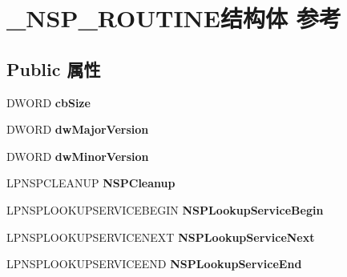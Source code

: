 \hypertarget{struct___n_s_p___r_o_u_t_i_n_e}{}\section{\+\_\+\+N\+S\+P\+\_\+\+R\+O\+U\+T\+I\+N\+E结构体 参考}
\label{struct___n_s_p___r_o_u_t_i_n_e}
\subsection*{Public 属性}
\begin{DoxyCompactItemize}
\item 
\mbox{\label{struct___n_s_p___r_o_u_t_i_n_e_ae17aa42cd98a70ca1a52e890ddb183b8}} 
D\+W\+O\+RD {\bfseries cb\+Size}
\item 
\mbox{\label{struct___n_s_p___r_o_u_t_i_n_e_a7c87db5336b73e35000628209497938e}} 
D\+W\+O\+RD {\bfseries dw\+Major\+Version}
\item 
\mbox{\label{struct___n_s_p___r_o_u_t_i_n_e_a803703593b52133727b5531937d79b9e}} 
D\+W\+O\+RD {\bfseries dw\+Minor\+Version}
\item 
\mbox{\label{struct___n_s_p___r_o_u_t_i_n_e_a62db9f10f983d97d85a63c59b890886e}} 
L\+P\+N\+S\+P\+C\+L\+E\+A\+N\+UP {\bfseries N\+S\+P\+Cleanup}
\item 
\mbox{\label{struct___n_s_p___r_o_u_t_i_n_e_a74f773b5c881ca6440dbae74b7f5c16c}} 
L\+P\+N\+S\+P\+L\+O\+O\+K\+U\+P\+S\+E\+R\+V\+I\+C\+E\+B\+E\+G\+IN {\bfseries N\+S\+P\+Lookup\+Service\+Begin}
\item 
\mbox{\label{struct___n_s_p___r_o_u_t_i_n_e_af49672529f24a8193478571c92e113d6}} 
L\+P\+N\+S\+P\+L\+O\+O\+K\+U\+P\+S\+E\+R\+V\+I\+C\+E\+N\+E\+XT {\bfseries N\+S\+P\+Lookup\+Service\+Next}
\item 
\mbox{\label{struct___n_s_p___r_o_u_t_i_n_e_adf08d0ac4ada229b3238b0f9479bc170}} 
L\+P\+N\+S\+P\+L\+O\+O\+K\+U\+P\+S\+E\+R\+V\+I\+C\+E\+E\+ND {\bfseries N\+S\+P\+Lookup\+Service\+End}
\item 

\end{DoxyCompactItemize}
